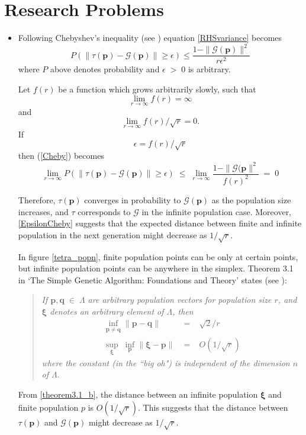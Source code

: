 \section{Research Problems}
\begin{itemize}
\item{
Following Chebyshev's inequality (see \cite{ChebyshevInequality}) equation \ref{RHSvariance} becomes  
\begin{equation}
\label{Cheby}
P(\| \tau (\bm{p}) - \mathcal{G}(\bm{p}) \| \geq \epsilon) \leq \frac{1 - \|\mathcal{G}(\bm{p})\|^2} {r{\epsilon}^2}
\end{equation}
where $P$ above denotes probability and $\epsilon \;>\; 0$ is arbitrary.

Let $f(r)$ be a function which grows arbitrarily slowly, such that 
\[
\lim_{r \to \infty} f(r)  =  \infty
\]
and
\[
\lim_{r \to \infty} f(r)/\sqrt{r}  =  0.
\]
If 
\begin{equation}
\label{EpsilonCheby}
\epsilon  =  f(r)/\sqrt{r}
\end{equation}
then (\ref{Cheby}) becomes
\begin{equation*}
\lim_{r \to \infty} P(\| \tau (\bm{p}) - \mathcal{G}(\bm{p}) \| \geq \epsilon) \; \leq \; \lim_{r \to \infty}\frac{1 - \|\mathcal{G}(\bm{p}\|^2} {{f(r)}^2} \; = \; 0
\end{equation*}

Therefore, $\tau(\bm{p})$ converges in probability to $\mathcal{G}(\bm{p})$ as the population size increases, 
and $\tau$ corresponds to $\mathcal{G}$ 
in the infinite population case. Moreover, \ref{EpsilonCheby} suggests that the expected distance between finite and 
infinite population in the next generation might decrease as $1/\sqrt{r}$.

In figure \ref{tetra_popn}, finite population points can be only at certain points, but infinite population points can be anywhere in the simplex. 
Theorem 3.1 in `The Simple Genetic Algorithm: Foundations and Theory' states (see \cite{Vose1999}):  
\begin{quote}
\emph{If $\bm{p},\bm{q} \;\in\; \Lambda$ are 
arbitrary population vectors for population size $r$, and $\bm{\xi}$ denotes an arbitrary element of $\Lambda$, then 
\begin{eqnarray}
\underset{\bm{p} \neq \bm{q}}{\inf} \|\bm{p} - \bm{q}\| &\;=\;& \sqrt{2}/r    \label{theorem3.1_a} \\
\underset{\bm{\xi}}{\sup} \; \underset{\bm{p}}{\inf} \|\bm{\xi} - \bm{p}\| &\;=\;& O(1/\sqrt{r})     \label{theorem3.1_b}
\end{eqnarray}
where the constant (in the ``big oh") is independent of the dimension $n$ of $\Lambda$}.
\end{quote}
From \ref{theorem3.1_b}, the distance between an infinite population $\bm{\xi}$ and finite population $p$ is $O(1/\sqrt{r})$. 
This suggests that the distance between $\tau (\bm{p})$ and $\mathcal{G}(\bm{p})$ might decrease as $1/\sqrt{r}$.

}
\end{itemize}
